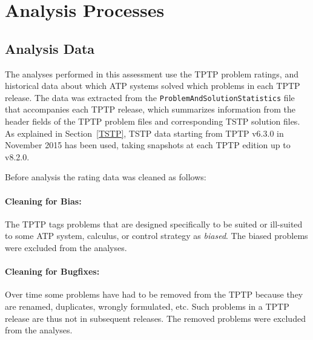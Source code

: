 \documentclass[runningheads]{llncs}
\begin{document}
\section{Analysis Processes}
\label{AnalysisProcesses}

\subsection{Analysis Data}
\label{AnalysisData}

The analyses performed in this assessment use the TPTP problem ratings, and historical data about 
which ATP systems solved which problems in each TPTP release.
The data was extracted from the {\tt ProblemAndSolutionStatistics} file that accompanies each TPTP 
release, which summarizes information from the header fields of the TPTP problem files and
corresponding TSTP solution files.
As explained in Section~\ref{TSTP}, TSTP data starting from TPTP v6.3.0 in November 2015 has been
used, taking snapshots at each TPTP edition up to v8.2.0.

Before analysis the rating data was cleaned as follows:

\vspace*{-0.5em}
\paragraph{Cleaning for Bias:}
The TPTP tags problems that are designed specifically to be suited or ill-suited to some ATP 
system, calculus, or control strategy as {\em biased}. 
The biased problems were excluded from the analyses.

\vspace*{-0.5em}
\paragraph{Cleaning for Bugfixes:}
Over time some problems have had to be removed from the TPTP because they are renamed, duplicates, 
wrongly formulated, etc.
Such problems in a TPTP release are thus not in subsequent releases.
The removed problems were excluded from the analyses.

\vspace*{-0.5em}
\end{document}
